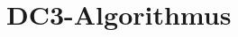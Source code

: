 \documentclass[12pt]{report}
\begin{document}
\section{DC3-Algorithmus}
\label{sec:DC3Algorithmus}



\nocite{*}
\end{document}
